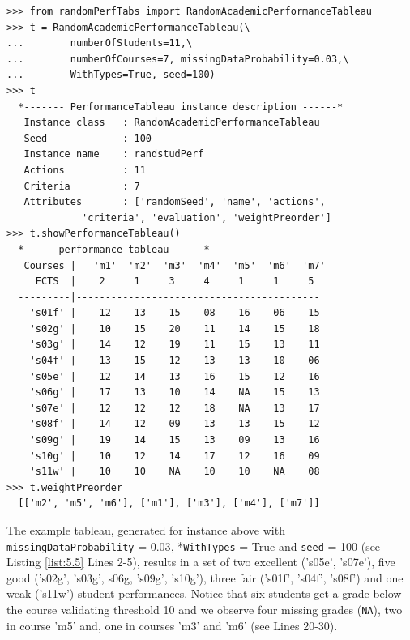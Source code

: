 \begin{lstlisting}[caption={Generating a random academic performance tableau},label=list:5.5]
>>> from randomPerfTabs import RandomAcademicPerformanceTableau
>>> t = RandomAcademicPerformanceTableau(\
...        numberOfStudents=11,\
...        numberOfCourses=7, missingDataProbability=0.03,\
...        WithTypes=True, seed=100)
>>> t
  *------- PerformanceTableau instance description ------*
   Instance class   : RandomAcademicPerformanceTableau
   Seed             : 100
   Instance name    : randstudPerf
   Actions          : 11
   Criteria         : 7
   Attributes       : ['randomSeed', 'name', 'actions',
             'criteria', 'evaluation', 'weightPreorder']
>>> t.showPerformanceTableau()
  *----  performance tableau -----*
   Courses |   'm1'  'm2'  'm3'  'm4'  'm5'  'm6'  'm7' 
     ECTS  |    2     1     3     4     1     1     5    
  ---------|------------------------------------------
    's01f' |    12    13    15    08    16    06    15   
    's02g' |    10    15    20    11    14    15    18   
    's03g' |    14    12    19    11    15    13    11   
    's04f' |    13    15    12    13    13    10    06   
    's05e' |    12    14    13    16    15    12    16   
    's06g' |    17    13    10    14    NA    15    13   
    's07e' |    12    12    12    18    NA    13    17   
    's08f' |    14    12    09    13    13    15    12   
    's09g' |    19    14    15    13    09    13    16   
    's10g' |    10    12    14    17    12    16    09   
    's11w' |    10    10    NA    10    10    NA    08
>>> t.weightPreorder
  [['m2', 'm5', 'm6'], ['m1'], ['m3'], ['m4'], ['m7']]
\end{lstlisting}
  
The example tableau, generated for instance above with \texttt{missingDataProbability} = $0.03$, *\texttt{WithTypes} = True and \texttt{seed} = 100 (see Listing \ref{list:5.5} Lines 2-5), results in a set of two excellent ('s05e', 's07e'), five good ('s02g', 's03g', s06g, 's09g', 's10g'), three fair ('s01f', 's04f', 's08f') and one weak ('s11w') student performances. Notice that six students get a grade below the course validating threshold 10 and we observe four missing grades (\texttt{NA}), two in course 'm5' and, one in courses 'm3' and 'm6' (see Lines 20-30).

